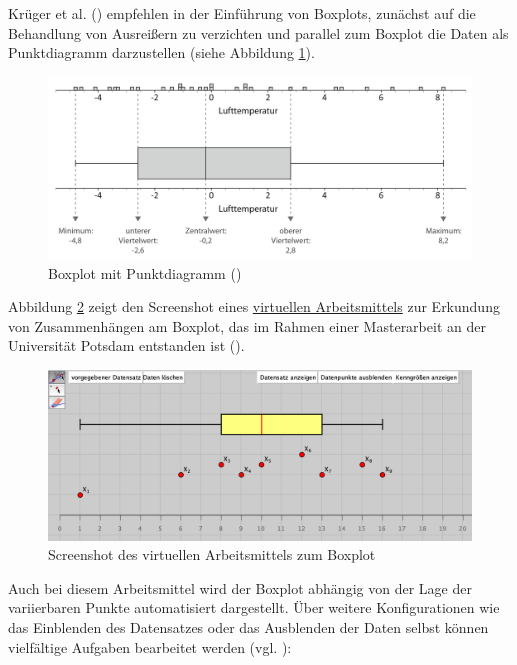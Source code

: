 \documentclass[
]{scrbook}
\theoremstyle{definition}
\theoremstyle{definition}
\theoremstyle{definition}
\theoremstyle{definition}
\theoremstyle{remark}
\begin{document}
Krüger et al. () empfehlen in der Einführung von Boxplots, zunächst auf die Behandlung von Ausreißern zu verzichten und parallel zum Boxplot die Daten als Punktdiagramm darzustellen (siehe Abbildung \ref{fig:Boxplot}).



\begin{figure}

{\centering \includegraphics[width=0.75\linewidth]{pictures/12-Boxplot} 

}

\caption{Boxplot mit Punktdiagramm ()}\label{fig:Boxplot}
\end{figure}

Abbildung \ref{fig:ScreenshotBoxplot} zeigt den Screenshot eines \href{files/Stoffdidaktik2024-12-Boxplot.html}{virtuellen Arbeitsmittels} zur Erkundung von Zusammenhängen am Boxplot, das im Rahmen einer Masterarbeit an der Universität Potsdam entstanden ist ().

\begin{figure}

{\centering \includegraphics[width=0.75\linewidth]{pictures/12-ScreenshotBoxplot} 

}

\caption{Screenshot des virtuellen Arbeitsmittels zum Boxplot}\label{fig:ScreenshotBoxplot}
\end{figure}

Auch bei diesem Arbeitsmittel wird der Boxplot abhängig von der Lage der variierbaren Punkte automatisiert dargestellt. Über weitere Konfigurationen wie das Einblenden des Datensatzes oder das Ausblenden der Daten selbst können vielfältige Aufgaben bearbeitet werden (vgl. ):
\end{document}
